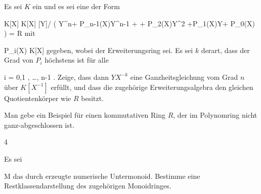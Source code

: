 {}
{





Es sei $K$ ein
und es sei eine
der Form

\mavergleichskettealigndrucklinks
{\vergleichskettealigndrucklinks
{ K[X]
}
{ \subseteq} { K[X] [Y]/ \left(  Y^n+ P_{n-1}(X)Y^{n-1} + \cdots + P_{2}(X)Y^{2} +P_1(X)Y+ P_0(X) \right)
}
{ =} { R
}
{ } {
}
{ } {
}
}
{}{}{}
mit

\mavergleichskette
{\vergleichskette
{P_i(X)
}
{ \in }{ K[X]
}
{  }{
}
{    }{
}
{   }{
}
}
{}{}{}
gegeben, wobei der Erweiterungsring
sei. Es sei $k$ derart, dass der Grad von $P_i$ höchstens
 ist für alle

\mavergleichskettedisp
{\vergleichskette
{ i
}
{ =} { 0,1 , \ldots , n-1
}
{ } {
}
{ } {
}
{ } {
}
}
{}{}{.}
Zeige, dass dann $YX^{-k}$ eine Ganzheitsgleichung vom Grad $n$ über $K[ X^{-1} ]$ erfüllt, und dass die zugehörige Erweiterungsalgebra
  den gleichen Quotientenkörper wie $R$  besitzt.





}
{} {}

{}
{





 { Man gebe ein Beispiel für einen kommutativen Ring $R$, der im Polynomring nicht ganz-abgeschlossen ist.
}





}
{} {}






{4}
{





Es sei

\mavergleichskette
{\vergleichskette
{ M
}
{ \subseteq }{ \N
}
{  }{
}
{    }{
}
{   }{
}
}
{}{}{}
das durch
 erzeugte numerische Untermonoid. Bestimme eine Restklassendarstellung des zugehörigen Monoidringes.





}
{} {}

